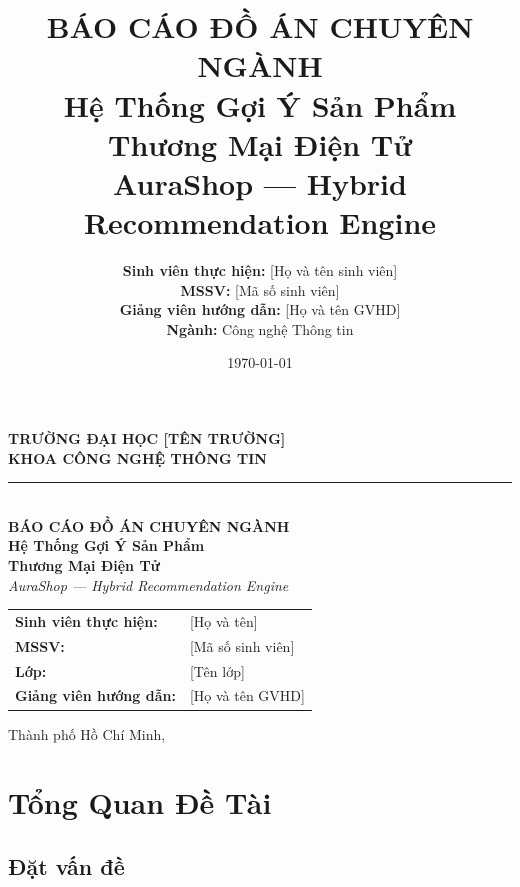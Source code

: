 \documentclass[12pt,a4paper]{report}
\title{
    \vspace{-2cm}
    \textbf{\Large BÁO CÁO ĐỒ ÁN CHUYÊN NGÀNH} \\[1cm]
    \textbf{\LARGE Hệ Thống Gợi Ý Sản Phẩm Thương Mại Điện Tử} \\[0.5cm]
    \textbf{\Large AuraShop — Hybrid Recommendation Engine} \\[2cm]
}
\author{
    \textbf{Sinh viên thực hiện:} [Họ và tên sinh viên] \\
    \textbf{MSSV:} [Mã số sinh viên] \\
    \textbf{Giảng viên hướng dẫn:} [Họ và tên GVHD] \\[1cm]
    \textbf{Ngành:} Công nghệ Thông tin
}
\date{\today}
\begin{document}
\begin{titlepage}
\centering
\vspace*{1cm}
{\Large \textbf{TRƯỜNG ĐẠI HỌC [TÊN TRƯỜNG]}} \\[0.3cm]
{\large \textbf{KHOA CÔNG NGHỆ THÔNG TIN}} \\[0.5cm]
\rule{\textwidth}{1pt} \\[2cm]

{\LARGE \textbf{BÁO CÁO ĐỒ ÁN CHUYÊN NGÀNH}} \\[1.5cm]
{\Huge \textbf{Hệ Thống Gợi Ý Sản Phẩm}} \\[0.3cm]
{\Huge \textbf{Thương Mại Điện Tử}} \\[0.5cm]
{\Large \textit{AuraShop — Hybrid Recommendation Engine}} \\[3cm]

\begin{flushleft}
\hspace{5cm}
\begin{tabular}{ll}
\textbf{Sinh viên thực hiện:} & [Họ và tên] \\
\textbf{MSSV:} & [Mã số sinh viên] \\
\textbf{Lớp:} & [Tên lớp] \\
\textbf{Giảng viên hướng dẫn:} & [Họ và tên GVHD] \\
\end{tabular}
\end{flushleft}

\vfill
{\large Thành phố Hồ Chí Minh, \the\year}
\end{titlepage}

\tableofcontents
\newpage
\listoffigures
\listoftables
\newpage

\chapter{Tổng Quan Đề Tài}

\section{Đặt vấn đề}
\end{document}
